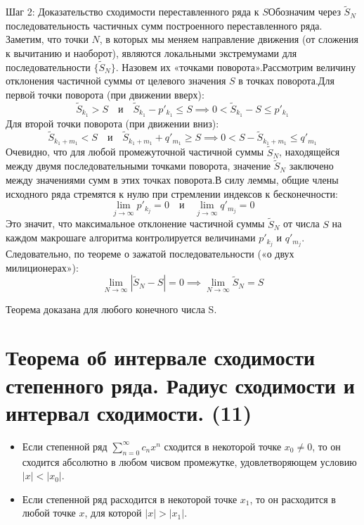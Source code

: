 \documentclass[14pt]{extreport}
\begin{document}
    Шаг 2: Доказательство сходимости переставленного ряда к $S$Обозначим через $\tilde{S}_N$ последовательность частичных сумм построенного переставленного ряда. Заметим, что точки $N$, в которых мы меняем направление движения (от сложения к вычитанию и наоборот), являются локальными экстремумами для последовательности $\{\tilde{S}_N\}$. Назовем их «точками поворота».Рассмотрим величину отклонения частичной суммы от целевого значения $S$ в точках поворота.Для первой точки поворота (при движении вверх):$$\tilde{S}_{k_1} > S \quad \text{и} \quad \tilde{S}_{k_1} - p'_{k_1} \le S \implies 0 < \tilde{S}_{k_1} - S \le p'_{k_1}$$Для второй точки поворота (при движении вниз):$$\tilde{S}_{k_1+m_1} < S \quad \text{и} \quad \tilde{S}_{k_1+m_1} + q'_{m_1} \ge S \implies 0 < S - \tilde{S}_{k_1+m_1} \le q'_{m_1}$$Очевидно, что для любой промежуточной частичной суммы $\tilde{S}_N$, находящейся между двумя последовательными точками поворота, значение $\tilde{S}_N$ заключено между значениями сумм в этих точках поворота.В силу леммы, общие члены исходного ряда стремятся к нулю при стремлении индексов к бесконечности:$$\lim_{j \to \infty} p'_{k_j} = 0 \quad \text{и} \quad \lim_{j \to \infty} q'_{m_j} = 0$$Это значит, что максимальное отклонение частичной суммы $\tilde{S}_N$ от числа $S$ на каждом макрошаге алгоритма контролируется величинами $p'_{k_j}$ и $q'_{m_j}$. Следовательно, по теореме о зажатой последовательности («о двух милиционерах»):$$\lim_{N \to \infty} |\tilde{S}_N - S| = 0 \implies \lim_{N \to \infty} \tilde{S}_N = S$$

    Теорема доказана для любого конечного числа S.


    \chapter{Теорема об интервале сходимости степенного ряда. Радиус сходимости и интервал
сходимости. (11)}

    \begin{theorem}
        \begin{itemize}
            \item Если степенной ряд $\sum_{n=0}^{\infty} c_n x^n$ сходится в некоторой точке $x_0 \neq 0$, то он сходится абсолютно в любом чисвом промежутке, удовлетворяющем условию $|x| < |x_0|$.
            \item Если степенной ряд расходится в некоторой точке $x_1$, то он расходится в любой точке $x$, для которой $|x| > |x_1|$.
        \end{itemize}
    \end{theorem}
	
\end{document}
